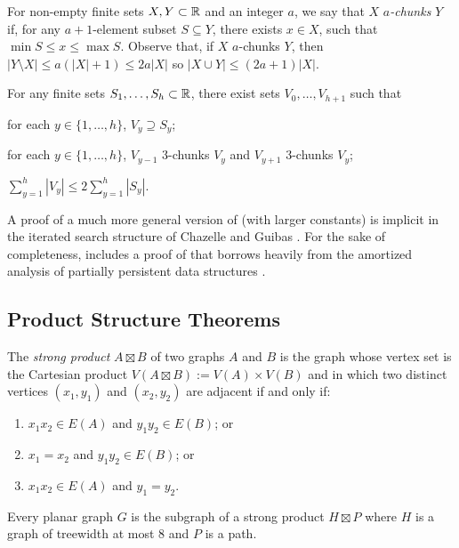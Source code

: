 \documentclass[kpfonts]{patmorin}
\let\le\leqslant
\begin{document}
For non-empty finite sets $X,Y\subset \mathbb{R}$ and an integer $a$, we say that $X$ \emph{$a$-chunks} $Y$ if, for any $a+1$-element subset $S\subseteq Y$, there exists $x\in X$, such that $\min S\le x\le \max S$. Observe that, if $X$ $a$-chunks $Y$, then $|Y\setminus X|\le a(|X|+1)\le 2a|X|$ so $|X\cup Y|\le (2a+1)|X|$. 

\begin{lem}
  For any finite sets $S_1,\ldots,S_h\subset\mathbb{R}$, there exist sets $V_0,\ldots,V_{h+1}$ such that
  \begin{compactenum}
    \item for each $y\in\{1,\ldots,h\}$, $V_y\supseteq S_y$;
    \item for each $y\in\{1,\ldots,h\}$, $V_{y-1}$ 3-chunks $V_y$ and $V_{y+1}$ 3-chunks $V_y$;
    \item $\sum_{y=1}^h |V_y|\le 2\sum_{y=1}^h |S_y|$.
  \end{compactenum}
\end{lem}

A proof of a much more general version of  (with larger constants) is implicit in the iterated search structure of Chazelle and Guibas \cite{chazelle.guibas:fractional1}.   For the sake of completeness,  includes a proof of  that borrows heavily from the amortized analysis of partially persistent data structures \cite[Section~2.3]{driscoll.sarnak.ea:making}.


\subsection{Product Structure Theorems}

The \emph{strong product} $A\boxtimes B$ of two graphs $A$ and $B$ is the graph whose vertex set is the Cartesian product $V(A\boxtimes B):=V(A)\times V(B)$ and in which two distinct vertices $(x_1,y_1)$ and $(x_2,y_2)$ are adjacent if and only if:
\begin{enumerate}
  \item  $x_1x_2 \in E(A)$ and $y_1y_2 \in E(B)$; or
  \item $x_1=x_2$ and $y_1y_2\in E(B)$; or
  \item $x_1x_2 \in E(A)$ and $y_1=y_2$.
\end{enumerate}

\begin{thm}
  Every planar graph $G$ is the subgraph of a strong product $H\boxtimes P$ where $H$ is a graph of treewidth at most 8 and $P$ is a path.
\end{thm}
\end{document}
